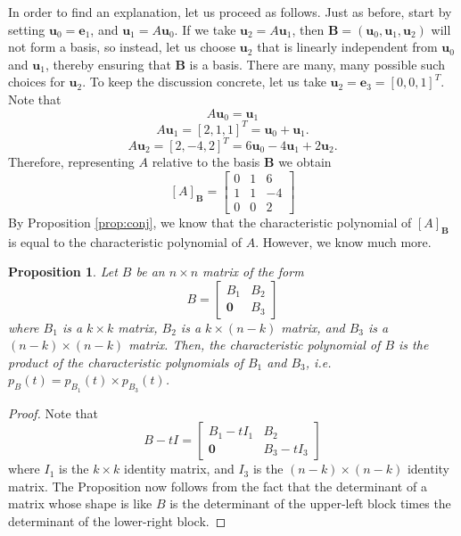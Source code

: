 \documentclass[12pt]{article}
\newcommand{\vu}{\mathbf{u}}
\newcommand{\ve}{\mathbf{e}}
\newcommand{\bB}{{\mathbf{B}}}
\newcommand{\lb}{\left[}
\newcommand{\rb}{\right]}
\newtheorem{proposition}{Proposition}
\begin{document}
In order to find an explanation, let us proceed as follows.  Just as
before, start by setting $\vu_0=\ve_1$, and $\vu_1=A\vu_0$.  If we
take $\vu_2=A\vu_1$, then $\bB=(\vu_0, \vu_1, \vu_2)$ will not form a
basis, so instead, let us choose $\vu_2$ that is linearly independent
from $\vu_0$ and $\vu_1$, thereby ensuring that $\bB$ is a basis.
There are many, many possible such choices for $\vu_2$.  To keep the
discussion concrete, let us take $\vu_2=\ve_3=[0,0,1]^T$.  Note that
$$A\vu_0 = \vu_1$$
$$A\vu_1 = [2,1,1]^T = \vu_0 + \vu_1.$$
$$A\vu_2 = [2,-4,2]^T = 6\vu_0 -4\vu_1 +2\vu_2.$$
Therefore, representing $A$ relative to the basis $\bB$ we obtain
$$[A]_\bB = 
\lb\begin{array}{rrr}
0 & 1 & 6 \\
1 & 1 & -4 \\
0 & 0 & 2
\end{array}\rb
$$
By Proposition \ref{prop:conj}, we know that the characteristic
polynomial of $[A]_\bB$ is equal to the characteristic polynomial of
$A$.  However, we know much more.
\begin{proposition}
\label{prop:2block}
Let $B$ be an $n\times n$ matrix of the form
$$B=\lb\begin{array}{cc} B_1 & B_2 \\ \mathbf{0} & B_3
\end{array}\rb$$
where 
$B_1$ is a $k\times k$ matrix, $B_2$ is a $k\times(n-k)$ matrix, and
$B_3$ is a $(n-k)\times(n-k)$ matrix.  Then, the characteristic
polynomial of $B$ is the product of the characteristic polynomials of
$B_1$ and $B_3$, i.e. $p_B(t) = p_{B_1}(t)\times p_{B_3}(t)$.
\end{proposition}
\begin{proof}
Note that 
$$B-tI =
 \lb\begin{array}{cc}
B_1-tI_1 & B_2 \\
\mathbf{0} & B_3 - tI_3
\end{array}\rb
$$
where $I_1$ is the $k\times k$ identity matrix, and $I_3$ is the
$(n-k)\times (n-k)$ identity matrix.  The Proposition now follows from
the fact that the determinant of a matrix whose shape is like $B$ is
the determinant of the upper-left block times the determinant of the
lower-right block.
\end{proof}
\end{document}
